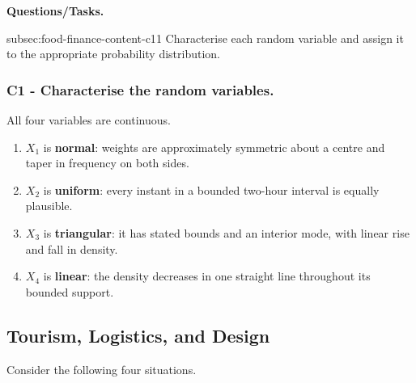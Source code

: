 	\textbf{Questions/Tasks.}
	\begin{enumerate}
		\CriterionTask
		{subsec:food-finance-content-c1}{1}
		{Characterise each random variable and assign it to the appropriate probability distribution.}
	\end{enumerate}

	\subsubsection*{C1 - Characterise the random variables.}
	\phantomsection
	\label{subsec:food-finance-content-c1}

	All four variables are continuous.
	\begin{enumerate}
		\item $X_1$ is \textbf{normal}: weights are approximately symmetric about a centre and taper in frequency on both sides.
		\item $X_2$ is \textbf{uniform}: every instant in a bounded two-hour interval is equally plausible.
		\item $X_3$ is \textbf{triangular}: it has stated bounds and an interior mode, with linear rise and fall in density.
		\item $X_4$ is \textbf{linear}: the density decreases in one straight line throughout its bounded support.
	\end{enumerate}


	\subsection{Tourism, Logistics, and Design}
	\label{sec:tourism-logistics-design}

	Consider the following four situations.

